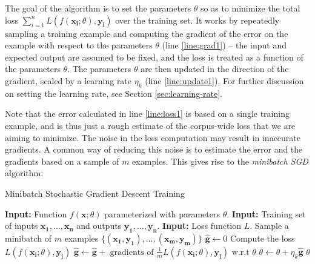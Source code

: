 \documentclass[jair,twoside,11pt,theapa]{article}
\newcommand{\m}[1]{\mathbf{#1}}%
\begin{document}
{The goal of the algorithm is to set the parameters $\theta$ so as to minimize the
total loss $\sum_{i=1}^{n}L(f(\m{x_i}; \theta), \m{y_i})$ over the training set.
It works by repeatedly sampling a training example and computing the gradient
of the error on the example with respect to the parameters $\theta$ (line
\ref{line:grad1}) -- the input and expected output are assumed to be
fixed, and the loss is treated as a function of the parameters $\theta$.
The parameters $\theta$ are then updated in the direction of the gradient, scaled by 
a learning rate $\eta_k$ (line \ref{line:update1}). For further discussion on setting the learning rate, see Section \ref{sec:learning-rate}.

Note that the error calculated in line \ref{line:loss1} is based on a single
training example, and is thus just a rough estimate of the corpus-wide loss that
we are aiming to minimize.  The noise in the loss computation may result in
inaccurate gradients.  
A common way of reducing this noise is to estimate the error and the gradients
based on a sample of $m$ examples. This gives rise to the \emph{minibatch SGD} algorithm:

\begin{algorithm}[h]
    \caption{Minibatch Stochastic Gradient Descent Training}
   \label{alg:minibatch-sgd}
\begin{algorithmic}[1]
    \State \textbf{Input:} Function $f(\m{x}; \theta)$ parameterized with parameters
    $\theta$.
    \State \textbf{Input:} Training set of inputs $\m{x_1},\ldots,\m{x_n}$ and outputs $\m{y_1},\ldots,\m{y_n}$.
    \State \textbf{Input:} Loss function $L$.
        \State Sample a minibatch of $m$ examples $\{(\m{x_1},\m{y_1}),\ldots,(\m{x_m},\m{y_m})\}$
        \State $\hat{\m{g}} \gets 0$ \label{line:loopstart}
        \State Compute the loss $L(f(\m{x_i}; \theta), \m{y_i})$
        \State $\m{\hat{g}} \gets \m{\hat{g}} + \text{ gradients of }
        \frac{1}{m} L(f(\m{x_i}; \theta), \m{y_i}) \text{ w.r.t } \theta $ \label{line:grad} 
    \EndFor \label{line:loopend}
    \State $\theta \gets \theta + \eta_k \m{\hat{g}} $
   \EndWhile
   \State \Return $\theta$
\end{algorithmic}
\end{algorithm}

}
\end{document}
